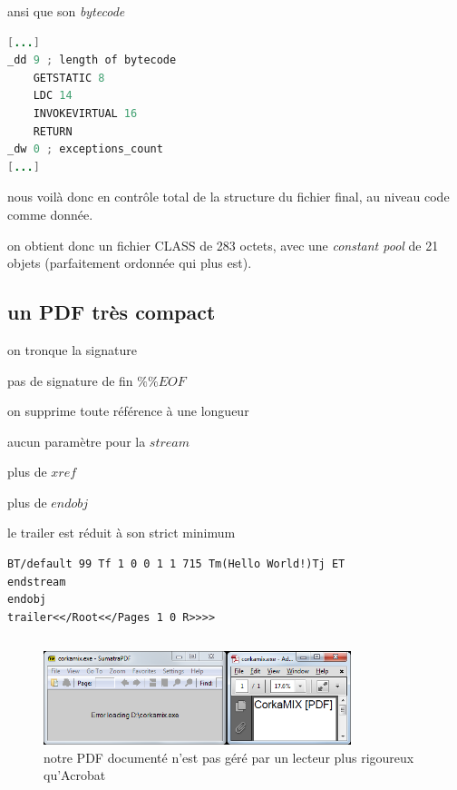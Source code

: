 ansi que son {\em bytecode}
\begin{lstlisting}[language={java},caption={un Hello World minimal en Java},label={lst:albertini:asmjavafields}]
[...]
_dd 9 ; length of bytecode
    GETSTATIC 8
    LDC 14
    INVOKEVIRTUAL 16
    RETURN
_dw 0 ; exceptions_count
[...]
\end{lstlisting}

nous voilà donc en contrôle total de la structure du fichier final, au niveau code comme donnée.

on obtient donc un fichier CLASS de 283 octets, avec une {\em constant pool} de 21 objets (parfaitement ordonnée qui plus est).

\subsection{un PDF très compact}
on tronque la signature

pas de signature de fin $\%\%EOF$

on supprime toute référence à une longueur

aucun paramètre pour la $stream$

plus de $xref$

plus de $endobj$

le trailer est réduit à son strict minimum
\begin{lstlisting}[language={},caption={un PDF réduit au minimum},label={lst:albertini:reducedPDF}]
%PDF- 1 0 obj<</Kids[<</Parent 1 0 R/Contents[2 0 R]>>]/Resources<<>>>>2 0 obj<<>>stream
BT/default 99 Tf 1 0 0 1 1 715 Tm(Hello World!)Tj ET
endstream
endobj
trailer<</Root<</Pages 1 0 R>>>>
\end{lstlisting}

\begin{lstlisting}[language={},caption={un PDF valide de 36 octets},label={lst:albertini:tinypdf}]
%PDF- trailer<</Root<</Pages<<>>>>>>
\end{lstlisting}

\begin{figure}[ht]
  \centering
  \includegraphics[width=0.8\textwidth]{albertini/img/undocumentedPDF}
  \caption{notre PDF documenté n'est pas géré par un lecteur plus rigoureux qu'Acrobat}
  \label{fig:albertini:undocumentedPDF}
\end{figure}


